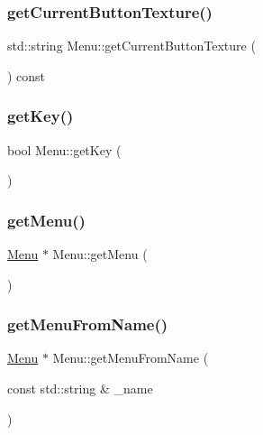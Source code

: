 \subsubsection{\texorpdfstring{getCurrentButtonTexture()}{getCurrentButtonTexture()}}
{\footnotesize\ttfamily std\+::string Menu\+::get\+Current\+Button\+Texture (\begin{DoxyParamCaption}{ }\end{DoxyParamCaption}) const}

\mbox{\label{class_menu_a30af92ed09a79c7c7309250790735f1a}} 
\subsubsection{\texorpdfstring{getKey()}{getKey()}}
{\footnotesize\ttfamily bool Menu\+::get\+Key (\begin{DoxyParamCaption}{ }\end{DoxyParamCaption})}

\mbox{\label{class_menu_af8f1a84e17db62dbf0aa91b7d7aeeca2}} 
\subsubsection{\texorpdfstring{getMenu()}{getMenu()}}
{\footnotesize\ttfamily \mbox{\hyperlink{class_menu}{Menu}} $\ast$ Menu\+::get\+Menu (\begin{DoxyParamCaption}{ }\end{DoxyParamCaption})}

\mbox{\label{class_menu_ad4b3784a847783e4c5d004057cfe8c51}} 
\subsubsection{\texorpdfstring{getMenuFromName()}{getMenuFromName()}}
{\footnotesize\ttfamily \mbox{\hyperlink{class_menu}{Menu}} $\ast$ Menu\+::get\+Menu\+From\+Name (\begin{DoxyParamCaption}\item[{const std\+::string \&}]{\+\_\+name }\end{DoxyParamCaption})}

